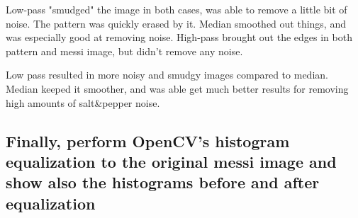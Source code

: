 \documentclass{article}
\begin{document}
 Low-pass "smudged" the image in both cases, was able to remove a little bit of noise. The pattern was quickly erased by it. Median smoothed out things, and was especially good at removing noise. High-pass brought out the edges in both pattern and messi image, but didn't remove any noise.

 Low pass resulted in more noisy and smudgy images compared to median. Median keeped it smoother, and was able get much better results for removing high amounts of salt\&pepper noise.

 \subsection{Finally, perform OpenCV’s histogram equalization to the original messi image and show also the histograms before and after equalization}
\end{document}
